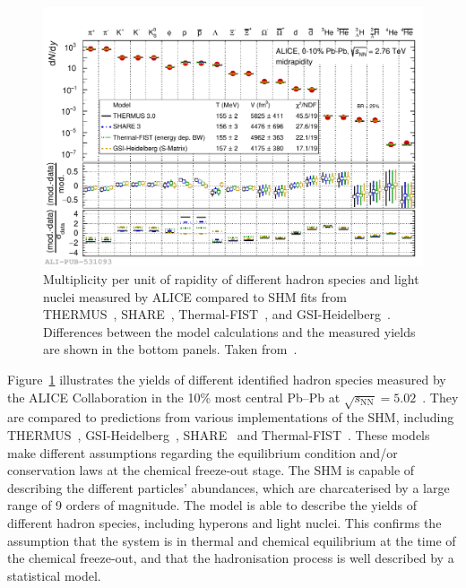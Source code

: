 \begin{figure}[htb]
  \centering
  \includegraphics[width=\linewidth]{Figures/Chapter 1/SHM_fit_PbPb010_arp_all.pdf}
  \caption{Multiplicity per unit of rapidity of different hadron species and light nuclei measured by ALICE compared to SHM fits from THERMUS~\cite{Wheaton:2004qb}, SHARE~\cite{Torrieri:2004zz}, Thermal-FIST~\cite{Vovchenko:2019pjl}, and GSI-Heidelberg~\cite{Andronic:2005yp}. Differences between the model calculations and the measured yields are shown in the bottom panels. Taken from~\cite{ALICE:2022wpn}.}
  \label{fig:SHM_fit}
\end{figure}

\begin{sloppypar}
Figure~\ref{fig:SHM_fit} illustrates the yields of different identified hadron species measured by the ALICE Collaboration in the 10\% most central Pb--Pb at $\sqrt{s_\mathrm{NN}} = 5.02$~\tev. They are compared to predictions from various implementations of the SHM, including THERMUS~\cite{Wheaton:2004qb}, GSI-Heidelberg~\cite{Andronic:2005yp}, SHARE~\cite{Torrieri:2004zz} and Thermal-FIST~\cite{Vovchenko:2019pjl}. These models make different assumptions regarding the equilibrium condition and/or conservation laws at the chemical freeze-out stage. The SHM is capable of describing the different particles' abundances, which are charcaterised by a large range of 9 orders of magnitude. The model is able to describe the yields of different hadron species, including hyperons and light nuclei. This confirms the assumption that the system is in thermal and chemical equilibrium at the time of the chemical freeze-out, and that the hadronisation process is well described by a statistical model.
\end{sloppypar}


